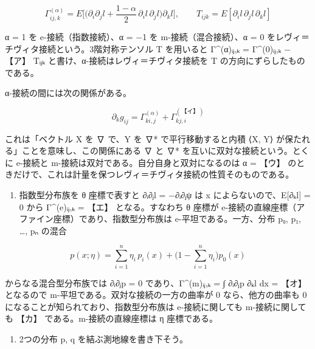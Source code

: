 \documentclass[
  10pt,
  a4paper,
]{article}
\providecommand{\tightlist}{%
  \setlength{\itemsep}{0pt}\setlength{\parskip}{0pt}}
\begin{document}
\[\Gamma^{(\alpha)}_{ij,k} = E\Big[ \Big( \partial_i \partial_j l + \frac{1 - \alpha}{2}\, \partial_i l\, \partial_j l \Big) \partial_k l \Big], \qquad T_{ijk} = E[\partial_i l\, \partial_j l\, \partial_k l]\]

α = 1 を e-接続（指数接続）、α = −1 を m-接続（混合接続）、α = 0
をレヴィ＝チヴィタ接続という。3階対称テンソル T を用いると
Γ\^{}(α){\fallbackfont ᵢⱼ},{\fallbackfont ₖ} =
Γ\^{}(0){\fallbackfont ᵢⱼ},{\fallbackfont ₖ} − 【ア】
T{\fallbackfont ᵢⱼₖ} と書け、α-接続はレヴィ＝チヴィタ接続を T
の方向にずらしたものである。

α-接続の間には次の関係がある。

\[\partial_k g_{ij} = \Gamma^{(\alpha)}_{ki,j} + \Gamma^{(\text{【イ】})}_{kj,i}\]

これは「ベクトル X を ∇ で、Y を ∇* で平行移動すると内積
{\fallbackfont ⟨}X, Y{\fallbackfont ⟩}
が保たれる」ことを意味し、この関係にある ∇ と ∇*
を互いに双対な接続という。とくに e-接続と
m-接続は双対である。自分自身と双対になるのは α = 【ウ】
のときだけで、これは計量を保つレヴィ＝チヴィタ接続の性質そのものである。

\begin{enumerate}
\def\labelenumi{(\arabic{enumi})}
\setcounter{enumi}{1}
\tightlist
\item
  指数型分布族を θ 座標で表すと ∂{\fallbackfont ᵢ}∂{\fallbackfont ⱼ}l =
  −∂{\fallbackfont ᵢ}∂{\fallbackfont ⱼ}ψ は x
  によらないので、E{[}∂{\fallbackfont ₖ}l{]} = 0 から
  Γ\^{}(e){\fallbackfont ᵢⱼ},{\fallbackfont ₖ} = 【エ】 となる。すなわち
  θ 座標が e-接続の直線座標（アファイン座標）であり、指数型分布族は
  e-平坦である。一方、分布 p{\fallbackfont ₀}, p{\fallbackfont ₁},
  \ldots, p{\fallbackfont ₙ} の混合
\end{enumerate}

\[p(x;\eta) = \sum_{i=1}^{n} \eta_i\, p_i(x) + \Big(1 - \sum_{i=1}^{n} \eta_i\Big) p_0(x)\]

からなる混合型分布族では ∂{\fallbackfont ᵢ}∂{\fallbackfont ⱼ}p = 0
であり、Γ\^{}(m){\fallbackfont ᵢⱼ},{\fallbackfont ₖ} = ∫
∂{\fallbackfont ᵢ}∂{\fallbackfont ⱼ}p ∂{\fallbackfont ₖ}l dx = 【オ】
となるので m-平坦である。双対な接続の一方の曲率が 0 なら、他方の曲率も 0
になることが知られており、指数型分布族は e-接続に関しても
m-接続に関しても 【カ】 である。m-接続の直線座標は η 座標である。

\begin{enumerate}
\def\labelenumi{(\arabic{enumi})}
\setcounter{enumi}{2}
\tightlist
\item
  2つの分布 p, q を結ぶ測地線を書き下そう。
\end{enumerate}
\end{document}
